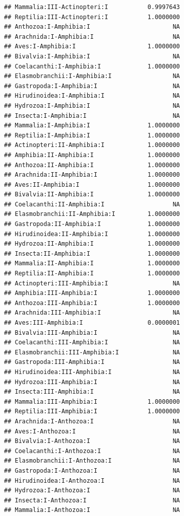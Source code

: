 \documentclass[
  12pt,
]{article}
\begin{document}
\begin{verbatim}
## Mammalia:III-Actinopteri:I           0.9997643
## Reptilia:III-Actinopteri:I           1.0000000
## Anthozoa:I-Amphibia:I                       NA
## Arachnida:I-Amphibia:I                      NA
## Aves:I-Amphibia:I                    1.0000000
## Bivalvia:I-Amphibia:I                       NA
## Coelacanthi:I-Amphibia:I             1.0000000
## Elasmobranchii:I-Amphibia:I                 NA
## Gastropoda:I-Amphibia:I                     NA
## Hirudinoidea:I-Amphibia:I                   NA
## Hydrozoa:I-Amphibia:I                       NA
## Insecta:I-Amphibia:I                        NA
## Mammalia:I-Amphibia:I                1.0000000
## Reptilia:I-Amphibia:I                1.0000000
## Actinopteri:II-Amphibia:I            1.0000000
## Amphibia:II-Amphibia:I               1.0000000
## Anthozoa:II-Amphibia:I               1.0000000
## Arachnida:II-Amphibia:I              1.0000000
## Aves:II-Amphibia:I                   1.0000000
## Bivalvia:II-Amphibia:I               1.0000000
## Coelacanthi:II-Amphibia:I                   NA
## Elasmobranchii:II-Amphibia:I         1.0000000
## Gastropoda:II-Amphibia:I             1.0000000
## Hirudinoidea:II-Amphibia:I           1.0000000
## Hydrozoa:II-Amphibia:I               1.0000000
## Insecta:II-Amphibia:I                1.0000000
## Mammalia:II-Amphibia:I               1.0000000
## Reptilia:II-Amphibia:I               1.0000000
## Actinopteri:III-Amphibia:I                  NA
## Amphibia:III-Amphibia:I              1.0000000
## Anthozoa:III-Amphibia:I              1.0000000
## Arachnida:III-Amphibia:I                    NA
## Aves:III-Amphibia:I                  0.0000001
## Bivalvia:III-Amphibia:I                     NA
## Coelacanthi:III-Amphibia:I                  NA
## Elasmobranchii:III-Amphibia:I               NA
## Gastropoda:III-Amphibia:I                   NA
## Hirudinoidea:III-Amphibia:I                 NA
## Hydrozoa:III-Amphibia:I                     NA
## Insecta:III-Amphibia:I                      NA
## Mammalia:III-Amphibia:I              1.0000000
## Reptilia:III-Amphibia:I              1.0000000
## Arachnida:I-Anthozoa:I                      NA
## Aves:I-Anthozoa:I                           NA
## Bivalvia:I-Anthozoa:I                       NA
## Coelacanthi:I-Anthozoa:I                    NA
## Elasmobranchii:I-Anthozoa:I                 NA
## Gastropoda:I-Anthozoa:I                     NA
## Hirudinoidea:I-Anthozoa:I                   NA
## Hydrozoa:I-Anthozoa:I                       NA
## Insecta:I-Anthozoa:I                        NA
## Mammalia:I-Anthozoa:I                       NA

\end{verbatim}
\end{document}
